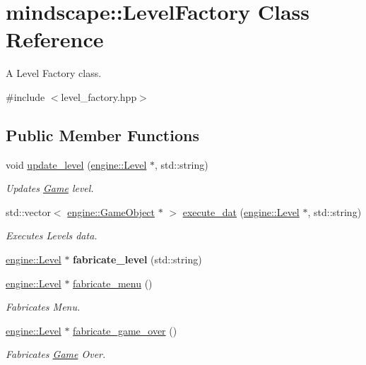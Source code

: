 \hypertarget{classmindscape_1_1_level_factory}{}\section{mindscape\+:\+:Level\+Factory Class Reference}
\label{classmindscape_1_1_level_factory}


A Level Factory class.  




{\ttfamily \#include $<$level\+\_\+factory.\+hpp$>$}

\subsection*{Public Member Functions}
\begin{DoxyCompactItemize}
\item 
void \hyperlink{classmindscape_1_1_level_factory_a3efd3986dfa9743e991136c2fd0fdfa7}{update\+\_\+level} (\hyperlink{classengine_1_1_level}{engine\+::\+Level} $\ast$, std\+::string)
\begin{DoxyCompactList}\small\item\em Updates \hyperlink{class_game}{Game} level. \end{DoxyCompactList}\item 
std\+::vector$<$ \hyperlink{classengine_1_1_game_object}{engine\+::\+Game\+Object} $\ast$ $>$ \hyperlink{classmindscape_1_1_level_factory_a7cbf020dcecda609facd675301f6500b}{execute\+\_\+dat} (\hyperlink{classengine_1_1_level}{engine\+::\+Level} $\ast$, std\+::string)
\begin{DoxyCompactList}\small\item\em Executes Level\textquotesingle{}s data. \end{DoxyCompactList}\item 
\hyperlink{classengine_1_1_level}{engine\+::\+Level} $\ast$ {\bfseries fabricate\+\_\+level} (std\+::string)\hypertarget{classmindscape_1_1_level_factory_a67ad7ffcf945347c5ad92e978981a7fc}{}\label{classmindscape_1_1_level_factory_a67ad7ffcf945347c5ad92e978981a7fc}

\item 
\hyperlink{classengine_1_1_level}{engine\+::\+Level} $\ast$ \hyperlink{classmindscape_1_1_level_factory_a034add473a2869c13784de4f321cd279}{fabricate\+\_\+menu} ()
\begin{DoxyCompactList}\small\item\em Fabricates Menu. \end{DoxyCompactList}\item 
\hyperlink{classengine_1_1_level}{engine\+::\+Level} $\ast$ \hyperlink{classmindscape_1_1_level_factory_ab1db9f9c0e7a7ce23c46580750a3e222}{fabricate\+\_\+game\+\_\+over} ()
\begin{DoxyCompactList}\small\item\em Fabricates \hyperlink{class_game}{Game} Over. \end{DoxyCompactList}\end{DoxyCompactItemize}


